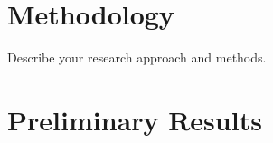 \documentclass[midterm]{sparreport}
\begin{document}
\section{Methodology}

Describe your research approach and methods.




\section{Preliminary Results}
\end{document}
